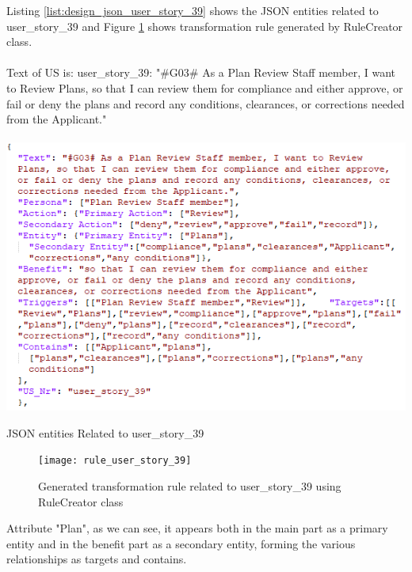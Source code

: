 \begin{example}
	Listing \ref{list:design_json_user_story_39} shows the JSON entities related to user\_story\_39 and Figure \ref{fig:design_rule_user_story_39} shows transformation rule generated by RuleCreator class.\\\\
	Text of US is:
	user\_story\_39: "\#G03\# As a Plan Review Staff member, I want to Review Plans, so that I can review them for compliance and either approve, or fail or deny the plans and record any conditions, clearances, or corrections needed from the Applicant."
	\begin{MyListing}
		\paragraph{}
		\centering
		\includegraphics[scale=0.8]{Listing/json_user_story_39.png}
		\caption{JSON entities Related to user\_story\_39}\label{list:design_json_user_story_39}
	\end{MyListing}
	\begin{figure}[h]
		\centering
		\texttt{[image: rule\_user\_story\_39]}
		\caption{Generated transformation rule related to user\_story\_39 using RuleCreator class}\label{fig:design_rule_user_story_39}
	\end{figure}
	Attribute "Plan", as we can see, it appears both in the main part as a primary entity and in the benefit part as a secondary entity, forming the various relationships as targets and contains.
\end{example}
